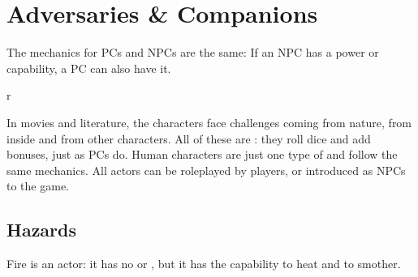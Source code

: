 \chapterspaceabove{6.75cm}
\chapterspacebelow{11.25cm}


\chapter{Adversaries \& Companions}

\begin{emphasisParagraph}
	The mechanics for PCs and NPCs are the same: If an NPC has a power or capability,
	a PC can also have it.
\end{emphasisParagraph}


\begin{wrapfigure}{r}{}
\end{wrapfigure}


In movies and literature, the characters face challenges coming from nature, from inside and from other characters.
All of these are : they roll dice and add bonuses, just as PCs do.
Human characters are just one type of  and follow the same mechanics.
All actors can be roleplayed by players, or introduced as NPCs to the game.


\section{Hazards}

Fire is an actor: it has no  or ,
but it has the capability to heat and to smother.




